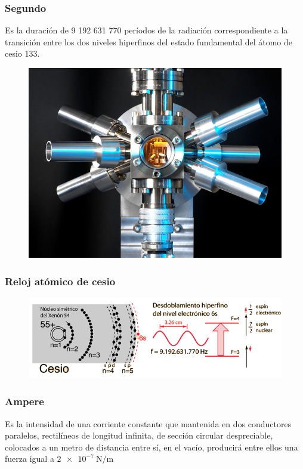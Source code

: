 \begin{frame}[plain]
\frametitle{Segundo}
Es la duración de 9 192 631 770 períodos de la radiación correspondiente a la transición entre los dos niveles hiperfinos del estado fundamental del átomo de cesio 133.
\begin{figure}
    \centering
    \includegraphics[scale=0.2]{./Imagenes/Reloj_Atomico.jpg}
\end{figure}
\end{frame}
\begin{frame}[plain]
\frametitle{Reloj atómico de cesio}
\begin{figure}
    \hspace*{-1cm}
    \centering
    \includegraphics[scale=0.6]{./Imagenes/Csclock.png}
\end{figure}
\end{frame}
\begin{frame}
\frametitle{Ampere}
Es la intensidad de una corriente constante que mantenida en dos conductores paralelos, rectilíneos de longitud infinita, de sección circular despreciable, colocados a un metro de distancia entre sí, en el vacío, producirá entre ellos una fuerza igual a $\SI{2e-7}{\newton\per\metre}$
\end{frame}
